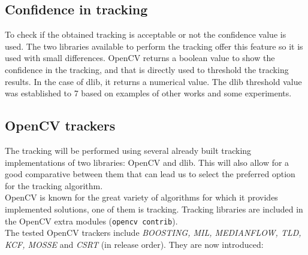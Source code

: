 \subsection{Confidence in tracking}\label{conf_in_tracking}
To check if the obtained tracking is acceptable or not the confidence value is used. The two libraries available to perform the tracking offer this feature so it is used with small differences. OpenCV returns a boolean value to show the confidence in the tracking, and that is directly used to threshold the tracking results. In the case of dlib, it returns a numerical value. The dlib threshold value was established to 7 based on examples of other works and some experiments.\\

\subsection{OpenCV trackers}
The tracking will be performed using several already built tracking implementations of two libraries: OpenCV and dlib. This will also allow for a good comparative between them that can lead us to select the preferred option for the tracking algorithm.\\
OpenCV is known for the great variety of algorithms for which it provides implemented solutions, one of them is tracking. Tracking libraries are included in the OpenCV extra modules (\texttt{opencv contrib}).\\
The tested OpenCV trackers include \textit{BOOSTING, MIL, MEDIANFLOW, TLD, KCF, MOSSE} and \textit{CSRT} (in release order). They are now introduced:
